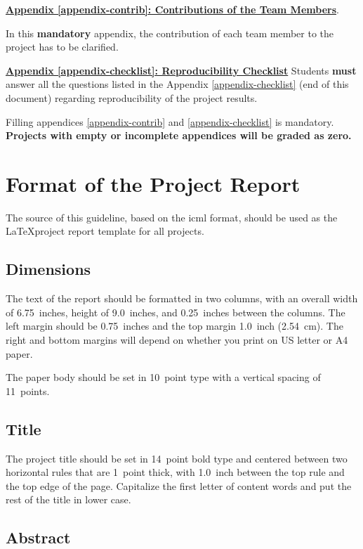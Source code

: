 \documentclass{article}
\begin{document}
\underline{\textbf{Appendix \ref{appendix-contrib}: Contributions of the Team Members}}.

In this \textbf{mandatory} appendix, the contribution of each team member to the project has to be clarified.

\underline{\textbf{Appendix \ref{appendix-checklist}: Reproducibility Checklist}} Students \textbf{must} answer all the questions listed in the Appendix \ref{appendix-checklist} (end of this document) regarding reproducibility of the project results.

Filling appendices \ref{appendix-contrib} and  \ref{appendix-checklist} is mandatory. \textbf{Projects with empty or incomplete appendices will be graded as zero.}

\section{Format of the Project Report}

The source of this guideline, based on the icml format, should be used as the \LaTeX project report template for all projects.

\subsection{Dimensions}

The text of the report should be formatted in two columns, with an
overall width of 6.75~inches, height of 9.0~inches, and 0.25~inches
between the columns. The left margin should be 0.75~inches and the top
margin 1.0~inch (2.54~cm). The right and bottom margins will depend on
whether you print on US letter or A4 paper.

The paper body should be set in 10~point type with a vertical spacing
of 11~points.

\subsection{Title}

The project title should be set in 14~point bold type and centered
between two horizontal rules that are 1~point thick, with 1.0~inch
between the top rule and the top edge of the page. Capitalize the
first letter of content words and put the rest of the title in lower
case.

\subsection{Abstract}
\end{document}
